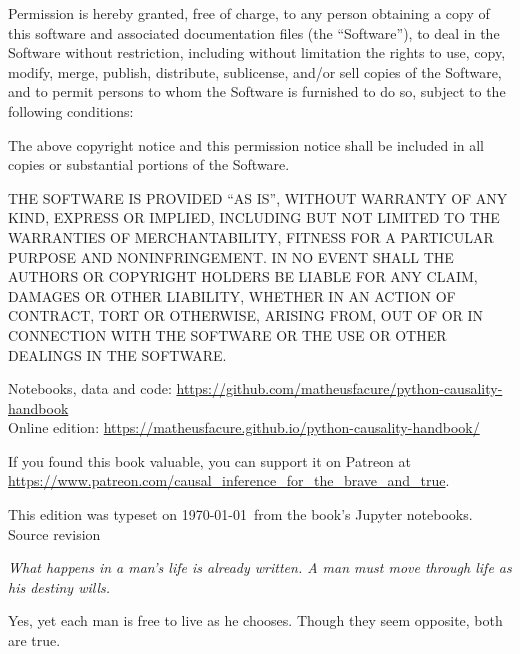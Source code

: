 {\color{inkgray}Permission is hereby granted, free of charge, to any person obtaining a copy of
this software and associated documentation files (the ``Software''), to deal in the Software
without restriction, including without limitation the rights to use, copy, modify, merge,
publish, distribute, sublicense, and/or sell copies of the Software, and to permit persons to
whom the Software is furnished to do so, subject to the following conditions:

The above copyright notice and this permission notice shall be included in all copies or
substantial portions of the Software.

THE SOFTWARE IS PROVIDED ``AS IS'', WITHOUT WARRANTY OF ANY KIND, EXPRESS OR IMPLIED,
INCLUDING BUT NOT LIMITED TO THE WARRANTIES OF MERCHANTABILITY, FITNESS FOR A PARTICULAR
PURPOSE AND NONINFRINGEMENT. IN NO EVENT SHALL THE AUTHORS OR COPYRIGHT HOLDERS BE LIABLE FOR
ANY CLAIM, DAMAGES OR OTHER LIABILITY, WHETHER IN AN ACTION OF CONTRACT, TORT OR OTHERWISE,
ARISING FROM, OUT OF OR IN CONNECTION WITH THE SOFTWARE OR THE USE OR OTHER DEALINGS IN THE
SOFTWARE.\par}

Notebooks, data and code: \url{https://github.com/matheusfacure/python-causality-handbook}\\
Online edition: \url{https://matheusfacure.github.io/python-causality-handbook/}

If you found this book valuable, you can support it on Patreon at
\url{https://www.patreon.com/causal_inference_for_the_brave_and_true}.

This edition was typeset on \today\ from the book's Jupyter notebooks.\\
Source revision \texttt{\sourcerevision}
\par\endgroup
\clearpage

\thispagestyle{empty}
\vspace*{2.4in}
\begingroup
\hfill\begin{minipage}{3.6in}\raggedright\itshape\color{ink}\fontsize{11}{15.5}\selectfont
What happens in a man's life is already written. A man must move through life as his destiny
wills.\par
{}\par
\vspace{12pt}
Yes, yet each man is free to live as he chooses. Though they seem opposite, both are true.\par
{}\par
\end{minipage}
\endgroup
\clearpage
